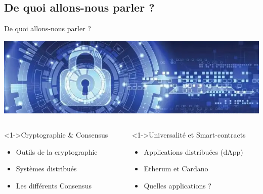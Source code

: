 \documentclass[presentation]{beamer}
\begin{document}
\subsection{De quoi allons-nous parler ?}
\label{sec:org4af2e2c}
\begin{frame}[label={sec:org2ba3ca3}]{De quoi allons-nous parler ?}
\begin{center}
\includegraphics[width=\textwidth]{Images/consensus_cryptographie.png}
\end{center}
\begin{columns}
\begin{column}{0.46\columnwidth}
\begin{block}<1->{Cryptographie \& Consensus}
\begin{itemize}
\item <1>Outils de la cryptographie
\item <1>Systèmes distribués
\item <1>Les différents Consensus
\end{itemize}
\end{block}
\end{column}

\begin{column}{0.54\columnwidth}
\begin{block}<1->{Universalité et Smart-contracts}
\begin{itemize}
\item <0> Applications distribuées (dApp)
\item <0> Etherum et Cardano
\item <0> Quelles applications ?
\end{itemize}
\end{block}
\end{column}
\end{columns}
\end{frame}
\end{document}
